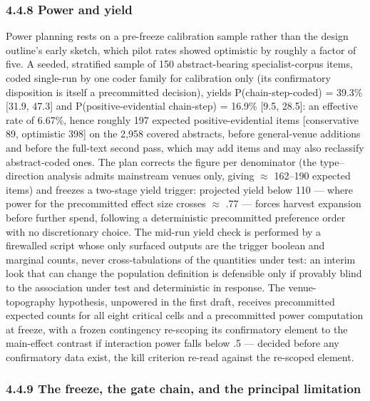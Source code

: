 \subsubsection{4.4.8 Power and yield}\label{power-and-yield}

Power planning rests on a pre-freeze calibration sample rather than the design outline's early sketch, which pilot rates showed optimistic by roughly a factor of five. A seeded, stratified sample of 150 abstract-bearing specialist-corpus items, coded single-run by one coder family for calibration only (its confirmatory disposition is itself a precommitted decision), yields P(chain-step-coded) = 39.3\% {[}31.9, 47.3{]} and P(positive-evidential \textbar{} chain-step) = 16.9\% {[}9.5, 28.5{]}: an effective rate of 6.67\%, hence roughly 197 expected positive-evidential items {[}conservative 89, optimistic 398{]} on the 2,958 covered abstracts, before general-venue additions and before the full-text second pass, which may add items and may also reclassify abstract-coded ones. The plan corrects the figure per denominator (the type--direction analysis admits mainstream venues only, giving $\approx$ 162--190 expected items) and freezes a two-stage yield trigger: projected yield below 110 --- where power for the precommitted effect size crosses $\approx$ .77 --- forces harvest expansion before further spend, following a deterministic precommitted preference order with no discretionary choice. The mid-run yield check is performed by a firewalled script whose only surfaced outputs are the trigger boolean and marginal counts, never cross-tabulations of the quantities under test: an interim look that can change the population definition is defensible only if provably blind to the association under test and deterministic in response. The venue-topography hypothesis, unpowered in the first draft, receives precommitted expected counts for all eight critical cells and a precommitted power computation at freeze, with a frozen contingency re-scoping its confirmatory element to the main-effect contrast if interaction power falls below .5 --- decided before any confirmatory data exist, the kill criterion re-read against the re-scoped element.

\subsubsection{4.4.9 The freeze, the gate chain, and the principal limitation}\label{the-freeze-the-gate-chain-and-the-principal-limitation}

